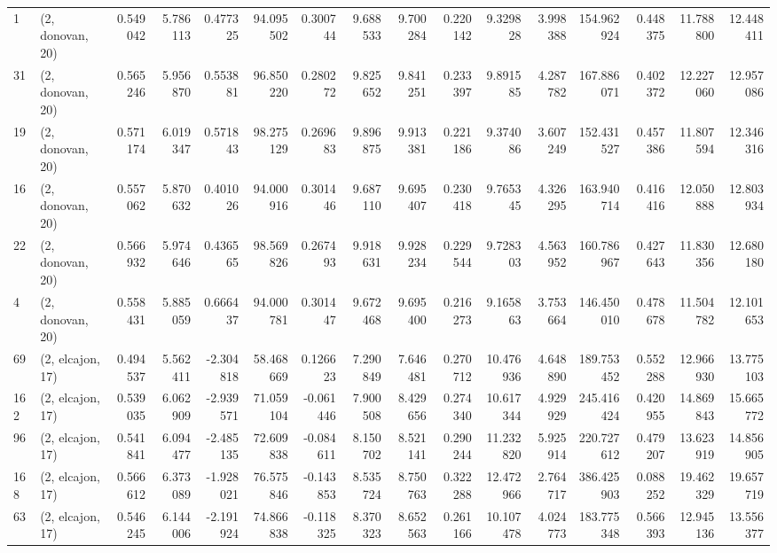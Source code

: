 \begin{tabular}{llrrrrrrrrrrrrrr}
1   &  (2, donovan, 20) &   0.549042 &   5.786113 &  0.477325 &   94.095502 &  0.300744 &   9.688533 &   9.700284 &  0.220142 &   9.329828 &   3.998388 &  154.962924 &  0.448375 &  11.788800 &  12.448411 \\
31  &  (2, donovan, 20) &   0.565246 &   5.956870 &  0.553881 &   96.850220 &  0.280272 &   9.825652 &   9.841251 &  0.233397 &   9.891585 &   4.287782 &  167.886071 &  0.402372 &  12.227060 &  12.957086 \\
19  &  (2, donovan, 20) &   0.571174 &   6.019347 &  0.571843 &   98.275129 &  0.269683 &   9.896875 &   9.913381 &  0.221186 &   9.374086 &   3.607249 &  152.431527 &  0.457386 &  11.807594 &  12.346316 \\
16  &  (2, donovan, 20) &   0.557062 &   5.870632 &  0.401026 &   94.000916 &  0.301446 &   9.687110 &   9.695407 &  0.230418 &   9.765345 &   4.326295 &  163.940714 &  0.416416 &  12.050888 &  12.803934 \\
22  &  (2, donovan, 20) &   0.566932 &   5.974646 &  0.436565 &   98.569826 &  0.267493 &   9.918631 &   9.928234 &  0.229544 &   9.728303 &   4.563952 &  160.786967 &  0.427643 &  11.830356 &  12.680180 \\
4   &  (2, donovan, 20) &   0.558431 &   5.885059 &  0.666437 &   94.000781 &  0.301447 &   9.672468 &   9.695400 &  0.216273 &   9.165863 &   3.753664 &  146.450010 &  0.478678 &  11.504782 &  12.101653 \\
69  &  (2, elcajon, 17) &   0.494537 &   5.562411 & -2.304818 &   58.468669 &  0.126623 &   7.290849 &   7.646481 &  0.270712 &  10.476936 &   4.648890 &  189.753452 &  0.552288 &  12.966930 &  13.775103 \\
162 &  (2, elcajon, 17) &   0.539035 &   6.062909 & -2.939571 &   71.059104 & -0.061446 &   7.900508 &   8.429656 &  0.274340 &  10.617344 &   4.929929 &  245.416424 &  0.420955 &  14.869843 &  15.665772 \\
96  &  (2, elcajon, 17) &   0.541841 &   6.094477 & -2.485135 &   72.609838 & -0.084611 &   8.150702 &   8.521141 &  0.290244 &  11.232820 &   5.925914 &  220.727612 &  0.479207 &  13.623919 &  14.856905 \\
168 &  (2, elcajon, 17) &   0.566612 &   6.373089 & -1.928021 &   76.575846 & -0.143853 &   8.535724 &   8.750763 &  0.322288 &  12.472966 &   2.764717 &  386.425903 &  0.088252 &  19.462329 &  19.657719 \\
63  &  (2, elcajon, 17) &   0.546245 &   6.144006 & -2.191924 &   74.866838 & -0.118325 &   8.370323 &   8.652563 &  0.261166 &  10.107478 &   4.024773 &  183.775348 &  0.566393 &  12.945136 &  13.556377 \\

\end{tabular}
